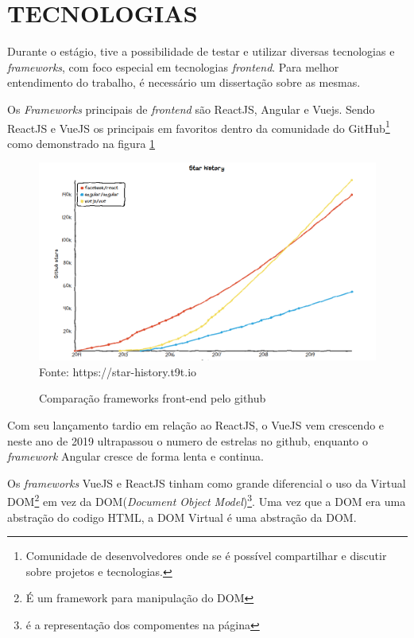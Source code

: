 \section{TECNOLOGIAS}
\label{cap:conclusao}

Durante o estágio, tive a possibilidade de testar e utilizar diversas tecnologias e \textit{frameworks}, com foco especial em tecnologias \textit{frontend}.
Para melhor entendimento do trabalho, é necessário um dissertação sobre as mesmas.

Os \textit{Frameworks} principais de \textit{frontend} são ReactJS, Angular e Vuejs.
Sendo ReactJS e VueJS os principais em favoritos dentro da comunidade do GitHub\footnote{Comunidade de desenvolvedores onde se é possível compartilhar e discutir sobre projetos e tecnologias.} como demonstrado na figura \ref{fig:github}

\begin{figure}[H]
\centering
\caption{Comparação frameworks front-end pelo github} %
\includegraphics[scale=0.55]{githubFramework}\\  %
\label{fig:github} %
{\small Fonte: https://star-history.t9t.io} %
\end{figure}

Com seu lançamento tardio em relação ao ReactJS, o VueJS vem crescendo e neste ano de 2019 ultrapassou o numero de estrelas no github, enquanto o \textit{framework} Angular
 cresce de forma lenta e continua.

Os \textit{frameworks} VueJS e ReactJS tinham como grande diferencial o uso da Virtual DOM\footnote{É um framework para manipulação do DOM} em vez da DOM(\textit{Document Object Model})\footnote{é a representação dos compomentes na página}. Uma vez que a DOM era uma abstração do codigo HTML, a DOM Virtual é uma abstração da DOM.

